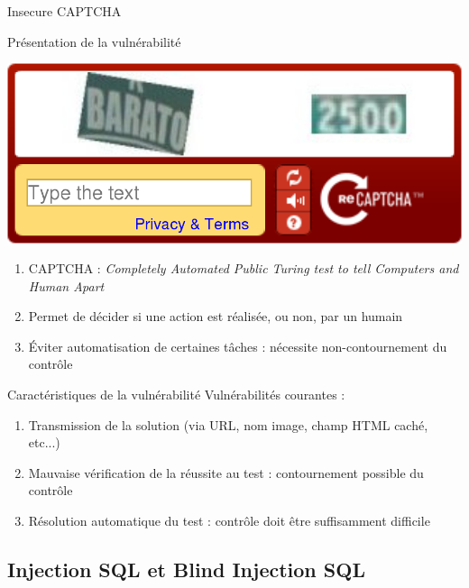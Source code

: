 \documentclass[8pt]{beamer}
\begin{document}
\begin{frame}{Insecure CAPTCHA}

\begin{block}{Présentation de la vulnérabilité}

\begin{center}
	\includegraphics[scale=.15]{../images/captcha1.png}
\end{center}

	\begin{enumerate}[\ding{217}]
		\item CAPTCHA :  \textit{Completely Automated Public Turing test to tell Computers and Human Apart}
		\item Permet de décider si une action est réalisée, ou non, par un humain
		\item Éviter automatisation de certaines tâches : nécessite non-contournement du contrôle
	\end{enumerate}
\end{block}

\begin{block}{Caractéristiques de la vulnérabilité}
Vulnérabilités courantes :
	\begin{enumerate}[\ding{217}]
		\item Transmission de la solution (via URL, nom image, champ HTML caché, etc...)
		\item Mauvaise vérification de la réussite au test : contournement possible du contrôle
		\item Résolution automatique du test : contrôle doit être suffisamment difficile
	\end{enumerate}
\end{block}


\end{frame}

\subsection{Injection SQL et Blind Injection SQL }
\end{document}
